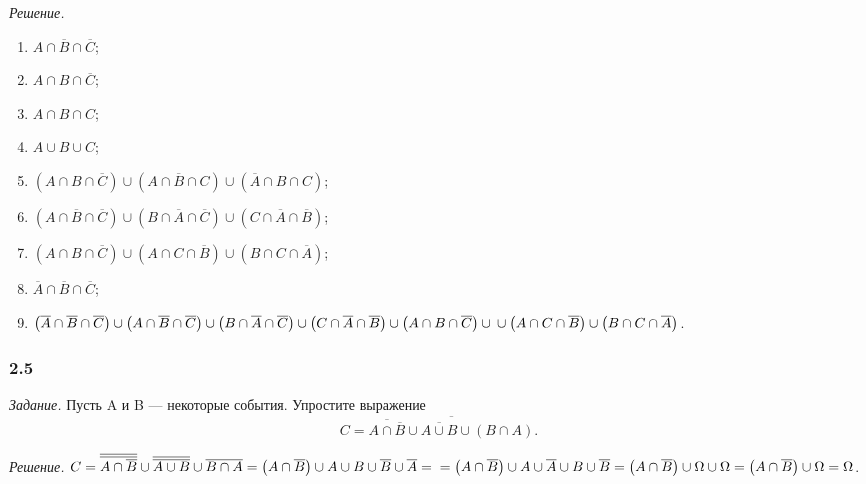 \textit{Решение.}
\begin{enumerate}[label=\alph*)]
\item $ A \cap \overline{ B } \cap \overline{ C } $;
\item $ A \cap B \cap \overline{ C } $;
\item $ A \cap B \cap C $;
\item $ A \cup B \cup C $;
\item $ \left( A \cap B  \cap \overline{C} \right) \cup \left( A \cap \overline{B} \cap C \right) \cup \left( \overline{A} \cap B \cap C \right) $;
\item $ \left( A \cap \overline{ B } \cap \overline{ C } \right) \cup \left( B \cap \overline{ A } \cap \overline{ C } \right)
\cup \left( C \cap \overline{ A } \cap \overline{ B } \right) $;
\item $ \left( A \cap B \cap \overline{ C } \right) \cup \left( A \cap C \cap \overline{ B } \right) \cup \left( B \cap C \cap \overline{ A } \right) $;
\item $ \overline{ A } \cap \overline{ B } \cap \overline{ C } $;
\item $ \left( \overline{ A } \cap \overline{ B } \cap \overline{ C } \right) \cup
\left( A \cap \overline{ B } \cap \overline{ C } \right) \cup
\left( B \cap \overline{ A } \cap \overline{ C } \right) \cup
\left( C \cap \overline{ A } \cap \overline{ B } \right) \cup
\left( A \cap B \cap \overline{ C } \right) \cup \\
\cup \left( A \cap C \cap \overline{ B } \right) \cup
\left( B \cap C \cap \overline{ A } \right)$.
\end{enumerate}

\subsubsection*{2.5}

\textit{Задание.} Пусть A и B --- некоторые события.
Упростите выражение
$$ C = \overline{ \overline{ A \cap \overline{ B } } \cup \overline{ A \cup B } \cup \left( B \cap A \right) }.$$

\textit{Решение.}
$ C =
\overline{ \overline{ A \cap \overline{ B }}} \cup \overline{ \overline{ A \cup B }} \cup \overline{ B \cap A } =
\left( A \cap \overline{ B } \right) \cup A \cup B \cup \overline{ B } \cup \overline{ A } = \\
= \left( A \cap \overline{ B } \right) \cup A \cup \overline{ A } \cup B \cup \overline{ B } =
\left( A \cap \overline{ B } \right) \cup \Omega \cup \Omega =
\left( A \cap \overline{ B } \right) \cup \Omega =
\Omega $.

